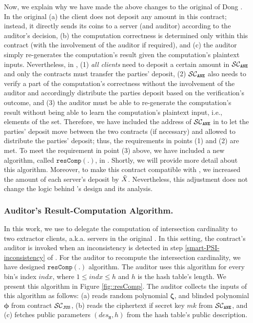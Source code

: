 Now, we explain why we have made the above changes to the original \SCpc of Dong \et \cite{dong2017betrayal}. In the original \SCpc (a) the client does not deposit any amount in this contract; instead, it directly sends its coins to a server (and auditor) according to the auditor's decision,  (b) the computation correctness is determined only within this contract (with the involvement of the auditor if required), and (c)  the auditor simply re-generates the computation's result given the computation's plaintext inputs.  Nevertheless, in \epsi, (1) \emph{all clients} need to deposit a certain amount in $\mathcal{SC}_{\mathtt{ANE}}$ and only the contracts must transfer the parties' deposit,  (2) $\mathcal{SC}_{\mathtt{ANE}}$ also needs to verify a part of the computation's correctness without the involvement of the auditor and accordingly distribute the parties deposit based on the verification's outcome,  and (3) the auditor must be able to re-generate the computation's result without being able to learn the computation's plaintext input, i.e., elements of the set. Therefore, we have included the address of $\mathcal{SC}_{\mathtt{ANE}}$ in \SCpc to let the parties' deposit move between the two contracts (if necessary) and allowed \SCpc to distribute the parties' deposit; thus, the requirements in points (1) and (2) are met. To meet the requirement in point (3) above, we have included a new algorithm, called $\mathtt{resComp}(.)$, in \SCpc.  Shortly, we will provide more detail about this algorithm. Moreover, to make this contract compatible with \epsi, we increased the amount of each server's deposit by  $\ddot{X}$. Nevertheless, this adjustment does not change the logic behind \SCpc's design and its analysis.  







\subsubsection{Auditor's Result-Computation Algorithm.}\label{sec::auditor-res-Comp}


In this work,  we use \SCpc to delegate the computation of intersection cardinality to two extractor clients, a.k.a. servers in the original \SCpc. In this setting, the contract's auditor is invoked when an inconsistency is detected in step \ref{smart-PSI-inconsistency} of \epsi. For the auditor to recompute the intersection cardinality, we have designed $\mathtt{resComp}(.)$ algorithm. The auditor uses this algorithm for every bin's index $indx$,  where $1\leq indx\leq h$ and $h$ is the hash table's length. We present this algorithm in Figure \ref{fig::resComp}.  The auditor collects the inputs of this algorithm as follows: (a)  reads random polynomial $\bm\zeta$, and blinded polynomial $\bm\phi$ from contract $\mathcal{SC}_{\mathtt{JUS}}$, (b) reads the ciphertext if secret key $mk$ from $\mathcal{SC}_{\mathtt{ANE}}$, and (c) fetches public parameters $(des_{\mathtt{H}}, h)$ from the hash table's public description. 



